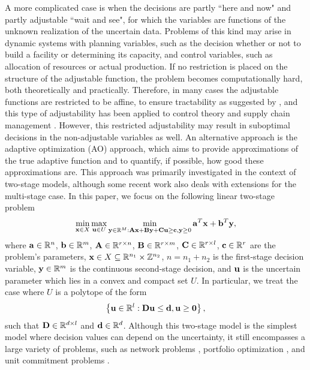 \documentclass[12pt,x11names]{article}
\theoremstyle{definition}
\newcommand{\paren}[1]{\left\{ {#1} \right\}} %
\newcommand{\real}{\mathbb{R}} %
\newcommand{\integ}{\mathbb{Z}} %
\newcommand{\bzero}{{\bf 0}}
\newcommand{\ba}{{\bf a}}
\newcommand{\bb}{{\bf b}}
\newcommand{\bc}{{\bf c}}
\newcommand{\bd}{{\bf d}}
\newcommand{\bu}{{\bf u}}
\newcommand{\bx}{{\bf x}}
\newcommand{\by}{{\bf y}}
\newcommand{\bba}{{\bf A}}
\newcommand{\bbb}{{\bf B}}
\newcommand{\bbc}{{\bf C}}
\newcommand{\bbd}{{\bf D}}
\begin{document}
A more complicated case is when the decisions are partly ``here and now" and partly adjustable ``wait and see", for which the variables are functions of the unknown realization of the uncertain data. Problems of this kind may arise in dynamic systems with planning variables, such as the decision whether or not to build a facility or determining its capacity, and control variables, such as allocation of resources or actual production. 
If no restriction is placed on the structure of the adjustable function, the problem becomes computationally hard, both theoretically  \citep{BenTal2004} and practically. Therefore, in many cases the adjustable functions are restricted to be affine, to ensure tractability as suggested by \citet{BenTal2004}, and this type of adjustability has been applied to control theory \citep{Goulart2006} and supply chain management \citep{BenTal2005,BenTal2009}. However, this restricted adjustability may result in suboptimal decisions in the non-adjustable variables as well. 
An alternative approach is the adaptive optimization (AO) approach, which aims to provide approximations of the true adaptive function and to quantify, if possible, how good these approximations are. This approach was primarily investigated in the context of two-stage models, although some recent work also deals with extensions for the multi-stage case. In this paper, we focus on the following linear two-stage problem
\begin{equation}\label{eq:2stage_robust}
\begin{aligned}
\min_{\bx\in X}\max_{\bu\in U} \min_{\by\in \real^M:\bba\bx+\bbb\by+\bbc\bu\geq \bc, \by\geq 0} \ba^T\bx+\bb^T\by,
\end{aligned}
\end{equation}
where $\ba\in \real^n$, $\bb\in\real^m$, $\bba\in\real^{r\times n}$, $\bbb\in \real^{r\times m}$, $\bbc\in \real^{r\times l}$, $\bc\in \real^{r}$ are the problem's parameters, $\bx\in X\subseteq \real^{n_1}\times \integ^{n_2}$, $n=n_1+n_2$ is the first-stage decision variable, $\by\in\real^m$ is the continuous second-stage decision, and $\bu$ is the uncertain parameter which lies in a convex and compact set $U$. 
In particular, we treat the case where $U$ is a polytope of the form
\begin{equation}
\label{eq:Define_U}
\paren{\bu\in \real^{l}:\bbd\bu\leq \bd, \bu\geq\bzero},
\end{equation} such that $\bbd\in \real^{d\times l}$ and $\bd\in \real^d$. 
Although this two-stage model is the simplest model where decision values can depend on the uncertainty, it still encompasses a large variety of problems, such as network problems \citep{AtamturkZhang2007,Gabrel2014}, portfolio optimization \citep{Takeda2007}, and unit commitment problems \citep{Bertsimas2013,Zhao2013}. 
\end{document}

